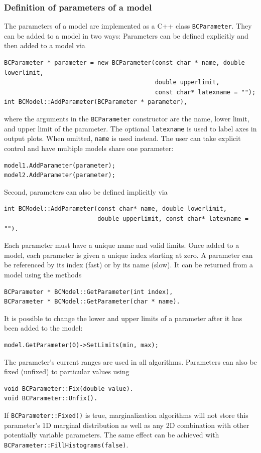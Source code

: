 \documentclass[11pt, a4paper]{article}
\newcommand{\code}[1]{\texttt{#1}}
\begin{document}

\subsubsection{Definition of parameters of a model}
\label{subsubsection:parameters}

The parameters of a model are implemented as a C++ class
\verb|BCParameter|. They can be added to a model in two ways:
Parameters can be defined explicitly and then added to a model via
%
\begin{verbatim}
BCParameter * parameter = new BCParameter(const char * name, double lowerlimit,
                                          double upperlimit,
                                          const char* latexname = "");
int BCModel::AddParameter(BCParameter * parameter),
\end{verbatim}
%
where the arguments in the \code{BCParameter} constructor are the
name, lower limit, and upper limit of the parameter. The optional
\verb|latexname| is used to label axes in output plots. When omitted,
\verb|name| is used instead. The user can take explicit control and
have multiple models share one parameter:
\begin{verbatim}
model1.AddParameter(parameter);
model2.AddParameter(parameter);
\end{verbatim}

Second, parameters can also be defined implicitly via
%
\begin{verbatim}
int BCModel::AddParameter(const char* name, double lowerlimit,
                          double upperlimit, const char* latexname = "").
\end{verbatim}

Each parameter must have a unique name and valid limits. Once added to
a model, each parameter is given a unique index starting at zero. A
parameter can be referenced by its index (fast) or by its name
(slow). It can be returned from a model using the methods
%
\begin{verbatim}
BCParameter * BCModel::GetParameter(int index),
BCParameter * BCModel::GetParameter(char * name).
\end{verbatim}

It is possible to change the lower and upper limits of a parameter
after it has been added to the model:
%
\begin{verbatim}
model.GetParameter(0)->SetLimits(min, max);
\end{verbatim}
%
The parameter's current ranges are used in all algorithms. Parameters
can also be fixed (unfixed) to particular values using
%
\begin{verbatim}
void BCParameter::Fix(double value).
void BCParameter::Unfix().
\end{verbatim}
%
If \texttt{BCParameter::Fixed()} is true, marginalization algorithms
will not store this parameter's 1D marginal distribution as well as
any 2D combination with other potentially variable parameters. The same
effect can be achieved with \texttt{BCParameter::FillHistograms(false)}.
\end{document}
